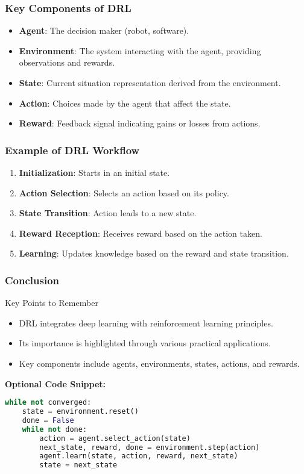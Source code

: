 \documentclass[aspectratio=169]{beamer}
\begin{document}
\begin{frame}[fragile]
    \frametitle{Key Components of DRL}
    \begin{itemize}
        \item \textbf{Agent}: The decision maker (robot, software).
        \item \textbf{Environment}: The system interacting with the agent, providing observations and rewards.
        \item \textbf{State}: Current situation representation derived from the environment.
        \item \textbf{Action}: Choices made by the agent that affect the state.
        \item \textbf{Reward}: Feedback signal indicating gains or losses from actions.
    \end{itemize}
\end{frame}

\begin{frame}[fragile]
    \frametitle{Example of DRL Workflow}
    \begin{enumerate}
        \item \textbf{Initialization}: Starts in an initial state.
        \item \textbf{Action Selection}: Selects an action based on its policy.
        \item \textbf{State Transition}: Action leads to a new state.
        \item \textbf{Reward Reception}: Receives reward based on the action taken.
        \item \textbf{Learning}: Updates knowledge based on the reward and state transition.
    \end{enumerate}
\end{frame}

\begin{frame}[fragile]
    \frametitle{Conclusion}
    \begin{block}{Key Points to Remember}
        \begin{itemize}
            \item DRL integrates deep learning with reinforcement learning principles.
            \item Its importance is highlighted through various practical applications.
            \item Key components include agents, environments, states, actions, and rewards.
        \end{itemize}
    \end{block}

    \textbf{Optional Code Snippet:}
    \begin{lstlisting}[language=Python]
while not converged:
    state = environment.reset()
    done = False
    while not done:
        action = agent.select_action(state)
        next_state, reward, done = environment.step(action)
        agent.learn(state, action, reward, next_state)
        state = next_state
    \end{lstlisting}
\end{frame}
\end{document}
